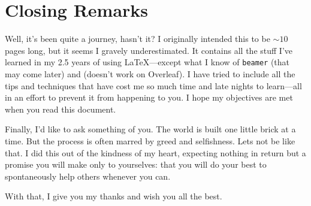 \chapter{Closing Remarks}
%
Well, it's been quite a journey, hasn't it? I originally intended this
to be $\sim 10$ pages long, but it seems I gravely underestimated.  It
contains all the stuff I've learned in my 2.5 years of using
\LaTeX---except what I know of \verb|beamer| (that may come later) and
 (doesn't work on Overleaf).  I have tried to include all
the tips and techniques that have cost me so much time and late nights
to learn---all in an effort to prevent it from happening to you.  I
hope my objectives are met when you read this document.

Finally, I'd like to ask something of you.  The world is built one
little brick at a time.  But the process is often marred by greed and
selfishness.  Lets not be like that.  I did this out of the kindness
of my heart, expecting nothing in return but a promise you will make
only to yourselves: that you will do your best to spontaneously help
others whenever you can.

With that, I give you my thanks and wish you all the best.
%
\nocite{*}
